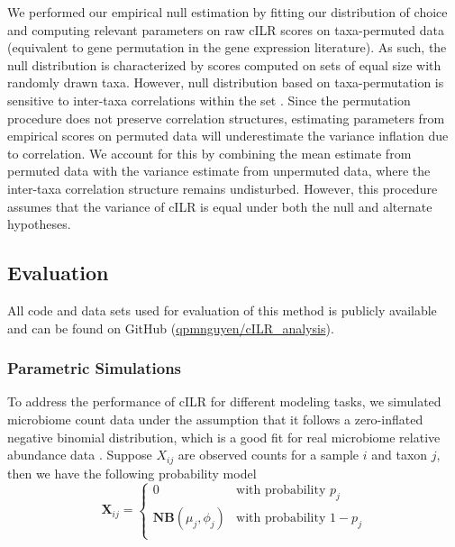 \documentclass[10pt,letterpaper]{article}
\begin{document}
We performed our empirical null estimation by fitting our distribution of choice and computing relevant parameters on raw cILR scores on taxa-permuted data (equivalent to gene permutation in the gene expression literature). As such, the null distribution is characterized by scores computed on sets of equal size with randomly drawn taxa. However, null distribution based on taxa-permutation is sensitive to inter-taxa correlations within the set \cite{wu2012}. Since the permutation procedure does not preserve correlation structures, estimating parameters from empirical scores on permuted data will underestimate the variance inflation due to correlation. We account for this by combining the mean estimate from permuted data with the variance estimate from unpermuted data, where the inter-taxa correlation structure remains undisturbed. However, this procedure assumes that the variance of cILR is equal under both the null and alternate hypotheses. 

\subsection*{Evaluation}
All code and data sets used for evaluation of this method is publicly available and can be found on GitHub (\href{www.github.com/qpmnguyen/cILR\_analysis}{qpmnguyen/cILR\_analysis}). 

\subsubsection*{Parametric Simulations}  
To address the performance of cILR for different modeling tasks, we simulated microbiome count data under the assumption that it follows a zero-inflated negative binomial distribution, which is a good fit for real microbiome relative abundance data \cite{calgaro2020}. Suppose $X_{ij}$ are observed counts for a sample $i$ and taxon $j$, then we have the following probability model
\begin{equation}
    \mathbf{X}_{ij} =
      \begin{cases}
        0 & \text{with probability $p_j$}\\
        \mathbf{NB}(\mu_j, \phi_j) & \text{with probability $1 - p_j$}\\
      \end{cases}       
\end{equation}
\end{document}
